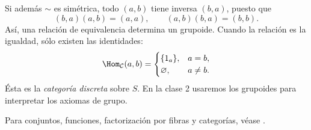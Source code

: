 Si además $\sim$ es simétrica, todo $(a,b)$ tiene inversa $(b,a)$, puesto que
\[
(b,a)(a,b)=(a,a),\qquad (a,b)(b,a)=(b,b).
\]
Así, una relación de equivalencia determina un grupoide. Cuando la relación es la igualdad, sólo existen las identidades:
\[
\Hom_{\mathcal C}(a,b)=
\begin{cases}\{1_a\},&a=b,\\\varnothing,&a\ne b.\end{cases}
\]
Ésta es la \emph{categoría discreta} sobre $S$. En la clase 2 usaremos los grupoides para interpretar los axiomas de grupo.

\begin{obs}
Para conjuntos, funciones, factorización por fibras y categorías, véase \citet[cap.~I, definición 1.1, proposiciones 2.1/3, teorema 2.7 y definición 3.1]{aluffi2009}.
\end{obs}
